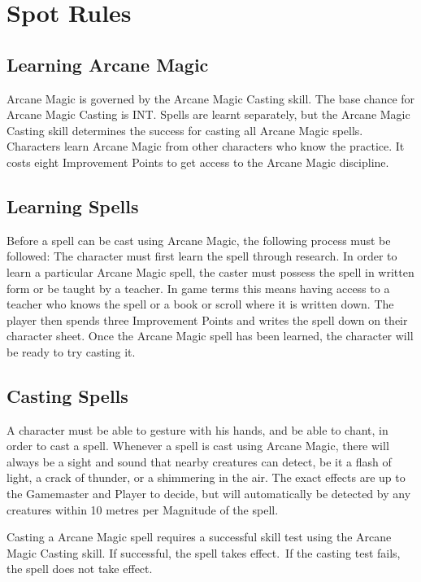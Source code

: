\section{Spot Rules}

\subsection{Learning Arcane Magic}
Arcane Magic is governed by the Arcane Magic Casting skill. The base chance for Arcane Magic Casting is INT. Spells are learnt separately, but the Arcane Magic Casting skill determines the success for casting all Arcane Magic spells. Characters learn Arcane Magic from other characters who know the practice. It costs eight Improvement Points to get access to the Arcane Magic discipline. 

\subsection{Learning Spells}
Before a spell can be cast using Arcane Magic, the following process must be followed:
The character must first learn the spell through research. In order to learn a particular Arcane Magic spell, the caster must possess the spell in written form or be taught by a teacher. In game terms this means having access to a teacher who knows the spell or a book or scroll where it is written down. The player then spends three Improvement Points and writes the spell down on their character sheet. Once the Arcane Magic spell has been learned, the character will be ready to try casting it.



\subsection{Casting Spells}
A character must be able to gesture with his hands, and be able to chant, in order to cast a spell. Whenever a spell is cast using Arcane Magic, there will always be a sight and sound that nearby creatures can detect, be it a flash of light, a crack of thunder, or a shimmering in the air. The exact effects are up to the Gamemaster and Player to decide, but will automatically be detected by any creatures within 10 metres per Magnitude of the spell. 

Casting a Arcane Magic spell requires a successful skill test using the Arcane Magic Casting skill. If successful, the spell takes effect. If the casting test fails, the spell does not take effect. 

